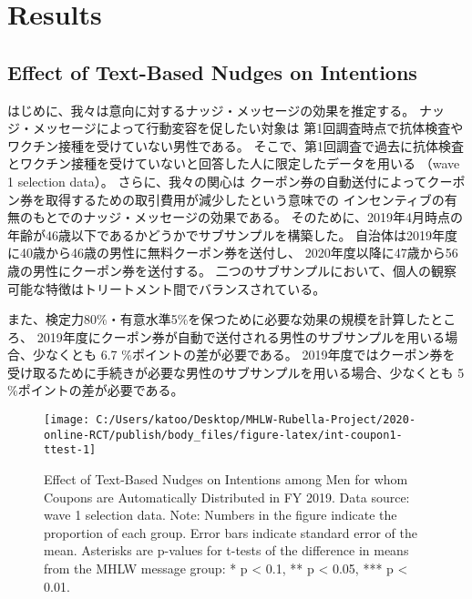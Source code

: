 \documentclass[
  11pt,
  a4paper,
]{article}
\begin{document}
\hypertarget{result}{%
\section{Results}\label{result}}

\hypertarget{intention}{%
\subsection{Effect of Text-Based Nudges on Intentions}\label{intention}}

はじめに、我々は意向に対するナッジ・メッセージの効果を推定する。
ナッジ・メッセージによって行動変容を促したい対象は
第1回調査時点で抗体検査やワクチン接種を受けていない男性である。
そこで、第1回調査で過去に抗体検査とワクチン接種を受けていないと回答した人に限定したデータを用いる
（wave 1 selection data）。
さらに、我々の関心は
クーポン券の自動送付によってクーポン券を取得するための取引費用が減少したという意味での
インセンティブの有無のもとでのナッジ・メッセージの効果である。
そのために、2019年4月時点の年齢が46歳以下であるかどうかでサブサンプルを構築した。
自治体は2019年度に40歳から46歳の男性に無料クーポン券を送付し、
2020年度以降に47歳から56歳の男性にクーポン券を送付する。
二つのサブサンプルにおいて、個人の観察可能な特徴はトリートメント間でバランスされている。

また、検定力80\%・有意水準5\%を保つために必要な効果の規模を計算したところ、
2019年度にクーポン券が自動で送付される男性のサブサンプルを用いる場合、少なくとも
6.7
\%ポイントの差が必要である。
2019年度ではクーポン券を受け取るために手続きが必要な男性のサブサンプルを用いる場合、少なくとも
5
\%ポイントの差が必要である。

\begin{figure}[t]
\texttt{[image: C:/Users/katoo/Desktop/MHLW-Rubella-Project/2020-online-RCT/publish/body\_files/figure-latex/int-coupon1-ttest-1]} \caption{Effect of Text-Based Nudges on Intentions among Men for whom Coupons are Automatically Distributed in FY 2019. Data source: wave 1 selection data. Note: Numbers in the figure indicate the proportion of each group. Error bars indicate standard error of the mean. Asterisks are p-values for t-tests of the difference in means from the MHLW message group: * p < 0.1, ** p < 0.05, *** p < 0.01.}\label{fig:int-coupon1-ttest}
\end{figure}
\end{document}
